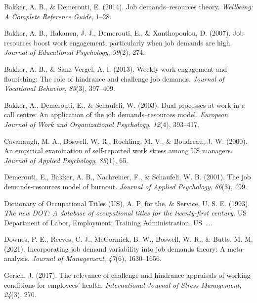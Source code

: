 \documentclass[
  english,
  man]{apa6}
\newlength{\cslhangindent}
\newlength{\cslentryspacingunit} %
\newenvironment{CSLReferences}[2] %
 {%
  \setlength{\parindent}{0pt}
  \ifodd #1
  \let\oldpar\par
  \def\par{\hangindent=\cslhangindent\oldpar}
  \fi
  \setlength{\parskip}{#2\cslentryspacingunit}
 }%
 {}
\begin{document}
\hypertarget{refs}{}
\begin{CSLReferences}{1}{0}
\leavevmode{}%
Bakker, A. B., \& Demerouti, E. (2014). Job demands--resources theory. \emph{Wellbeing: A Complete Reference Guide}, 1--28.

\leavevmode{}%
Bakker, A. B., Hakanen, J. J., Demerouti, E., \& Xanthopoulou, D. (2007). Job resources boost work engagement, particularly when job demands are high. \emph{Journal of Educational Psychology}, \emph{99}(2), 274.

\leavevmode{}%
Bakker, A. B., \& Sanz-Vergel, A. I. (2013). Weekly work engagement and flourishing: The role of hindrance and challenge job demands. \emph{Journal of Vocational Behavior}, \emph{83}(3), 397--409.

\leavevmode{}%
Bakker, A., Demerouti, E., \& Schaufeli, W. (2003). Dual processes at work in a call centre: An application of the job demands--resources model. \emph{European Journal of Work and Organizational Psychology}, \emph{12}(4), 393--417.

\leavevmode{}%
Cavanaugh, M. A., Boswell, W. R., Roehling, M. V., \& Boudreau, J. W. (2000). An empirical examination of self-reported work stress among US managers. \emph{Journal of Applied Psychology}, \emph{85}(1), 65.

\leavevmode{}%
Demerouti, E., Bakker, A. B., Nachreiner, F., \& Schaufeli, W. B. (2001). The job demands-resources model of burnout. \emph{Journal of Applied Psychology}, \emph{86}(3), 499.

\leavevmode{}%
Dictionary of Occupational Titles (US), A. P. for the, \& Service, U. S. E. (1993). \emph{The new DOT: A database of occupational titles for the twenty-first century}. US Department of Labor, Employment; Training Administration, US~\ldots.

\leavevmode{}%
Downes, P. E., Reeves, C. J., McCormick, B. W., Boswell, W. R., \& Butts, M. M. (2021). Incorporating job demand variability into job demands theory: A meta-analysis. \emph{Journal of Management}, \emph{47}(6), 1630--1656.

\leavevmode{}%
Gerich, J. (2017). The relevance of challenge and hindrance appraisals of working conditions for employees' health. \emph{International Journal of Stress Management}, \emph{24}(3), 270.


\end{CSLReferences}
\end{document}
